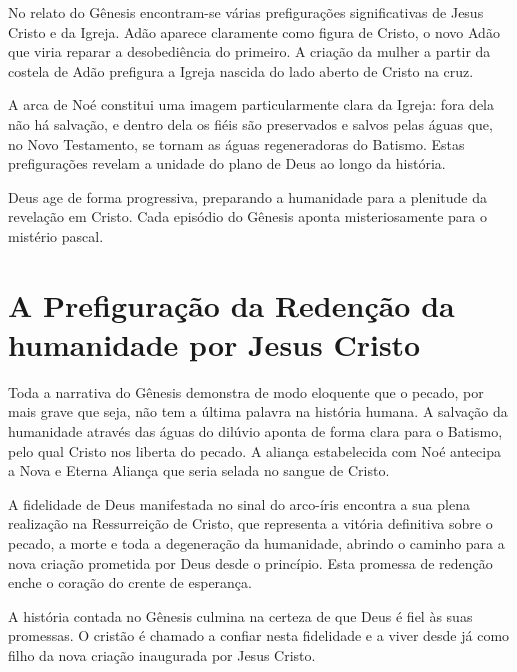 No relato do Gênesis encontram-se várias prefigurações significativas de Jesus Cristo e da Igreja. Adão aparece claramente como figura de Cristo, o novo Adão que viria reparar a desobediência do primeiro. A criação da mulher a partir da costela de Adão prefigura a Igreja nascida do lado aberto de Cristo na cruz.

A arca de Noé constitui uma imagem particularmente clara da Igreja: fora dela não há salvação, e dentro dela os fiéis são preservados e salvos pelas águas que, no Novo Testamento, se tornam as águas regeneradoras do Batismo. Estas prefigurações revelam a unidade do plano de Deus ao longo da história.

Deus age de forma progressiva, preparando a humanidade para a plenitude da revelação em Cristo. Cada episódio do Gênesis aponta misteriosamente para o mistério pascal.

\section{A Prefiguração da Redenção da humanidade por Jesus Cristo}

Toda a narrativa do Gênesis demonstra de modo eloquente que o pecado, por mais grave que seja, não tem a última palavra na história humana. A salvação da humanidade através das águas do dilúvio aponta de forma clara para o Batismo, pelo qual Cristo nos liberta do pecado. A aliança estabelecida com Noé antecipa a Nova e Eterna Aliança que seria selada no sangue de Cristo.

A fidelidade de Deus manifestada no sinal do arco-íris encontra a sua plena realização na Ressurreição de Cristo, que representa a vitória definitiva sobre o pecado, a morte e toda a degeneração da humanidade, abrindo o caminho para a nova criação prometida por Deus desde o princípio. Esta promessa de redenção enche o coração do crente de esperança.

A história contada no Gênesis culmina na certeza de que Deus é fiel às suas promessas. O cristão é chamado a confiar nesta fidelidade e a viver desde já como filho da nova criação inaugurada por Jesus Cristo.